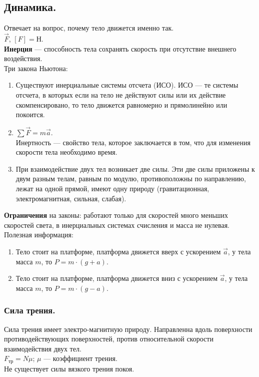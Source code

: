 \documentclass{article}
\begin{document}
	\subsection{Динамика.}
	Отвечает на вопрос, почему тело движется именно так. \\
	$\vec{F}$, $[F] = \text{Н}$. \\
	\textbf{Инерция} --- способность тела сохранять скорость при отсутствие внешнего воздействия. \\
	Три закона Ньютона:
	\begin{enumerate}[1.]
		\item Существуют инерциальные системы отсчета (ИСО). ИСО --- те системы отсчета, в которых если на тело не действуют силы или их действие скомпенсировано, то тело движется равномерно и прямолинейно или покоится.
		\item $\sum\vec{F} = m\vec{a}$. \\
		Инертность --- свойство тела, которое заключается в том, что для изменения скорости тела необходимо время.
		\item При взаимодействие двух тел возникает две силы. Эти две силы приложены к двум разным телам, равным по модулю, противоположны по направлению, лежат на одной прямой, имеют одну природу (гравитационная, электромагнитная, сильная, слабая).
	\end{enumerate}
	\textbf{Ограничения} на законы: работают только для скоростей много меньших скоростей света, в инерциальных системах счисления и масса не нулевая. \\
	Полезная информация:
	\begin{enumerate}
		\item Тело стоит на платформе, платформа движется вверх с ускорением $\vec{a}$, у тела масса $m$, то $P = m \cdot (g + a)$.
		\item Тело стоит на платформе, платформа движется вниз с ускорением $\vec{a}$, у тела масса $m$, то $P = m \cdot (g - a)$.
	\end{enumerate}
	\subsubsection{Сила трения.}
	Сила трения имеет электро-магнитную природу. Направленна вдоль поверхности противодействующих поверхностей, против относительной скорости взаимодействия двух тел. \\
	$F_{\text{тр}} = N\mu$; $\mu$ --- коэффициент трения. \\
	Не существует силы вязкого трения покоя.
\end{document}
